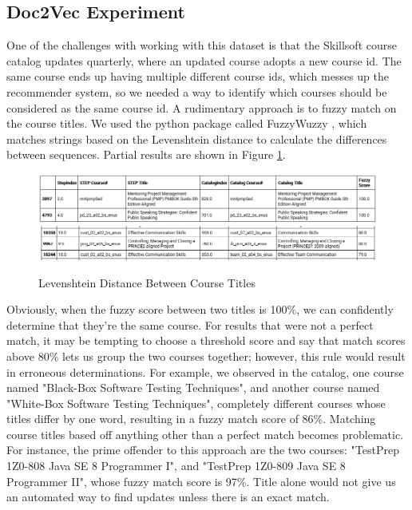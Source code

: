 \documentclass[12pt,journal]{IEEEtran}
\begin{document}
\subsection{Doc2Vec Experiment}
One of the challenges with working with this dataset is that the Skillsoft course catalog updates quarterly, where an updated course adopts a new course id.  The same course ends up having multiple different course ids, which messes up the recommender system, so we needed a way to identify which courses should be considered as the same course id.  A rudimentary approach is to fuzzy match on the course titles.  We used the python package called FuzzyWuzzy \cite{fuzzywuzzy}, which matches strings based on the Levenshtein distance to calculate the differences between sequences.  Partial results are shown in Figure \ref{fig:Levenshtein}.

\begin{figure}[htbp]
\begin{center}
\includegraphics[width=1\columnwidth]{fuzzywuzzy_top}
\includegraphics[width=1\columnwidth]{fuzzywuzzy_score_80}
\end{center}
\caption{Levenshtein Distance Between Course Titles}
\label{fig:Levenshtein}
\end{figure}

  Obviously, when the fuzzy score between two titles is 100\%, we can confidently determine that they're the same course.  For results that were not a perfect match, it may be tempting to choose a threshold score and say that match scores above 80\% lets us group the two courses together; however, this rule would result in erroneous determinations.  For example, we observed in the catalog, one course named "Black-Box Software Testing Techniques", and another course named "White-Box Software Testing Techniques", completely different courses whose titles differ by one word, resulting in a fuzzy match score of 86\%.  Matching course titles based off anything other than a perfect match becomes problematic.  For instance, the prime offender to this approach are the two courses: "TestPrep 1Z0-808 Java SE 8 Programmer I", and "TestPrep 1Z0-809 Java SE 8 Programmer II", whose fuzzy match score is 97\%.  Title alone would not give us an automated way to find updates unless there is an exact match.
\end{document}
